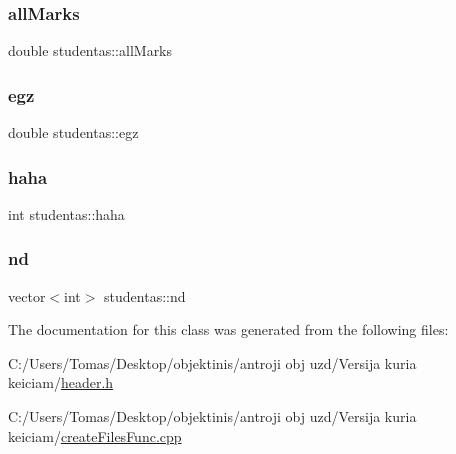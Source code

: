 \subsubsection{\texorpdfstring{allMarks}{allMarks}}
{\footnotesize\ttfamily double studentas\+::all\+Marks\hspace{0.3cm}{\ttfamily [private]}}

\mbox{\label{classstudentas_ae7145730b8737e3ceb2173bcb7460b2d}} 
\subsubsection{\texorpdfstring{egz}{egz}}
{\footnotesize\ttfamily double studentas\+::egz\hspace{0.3cm}{\ttfamily [private]}}

\mbox{\label{classstudentas_af3d5908e76c35d49ffca65ac4d62665c}} 
\subsubsection{\texorpdfstring{haha}{haha}}
{\footnotesize\ttfamily int studentas\+::haha\hspace{0.3cm}{\ttfamily [private]}}

\mbox{\label{classstudentas_a8aef5bd85b89d611446851d143303d35}} 
\subsubsection{\texorpdfstring{nd}{nd}}
{\footnotesize\ttfamily vector$<$int$>$ studentas\+::nd\hspace{0.3cm}{\ttfamily [private]}}



The documentation for this class was generated from the following files\+:\begin{DoxyCompactItemize}
\item 
C\+:/\+Users/\+Tomas/\+Desktop/objektinis/antroji obj uzd/\+Versija kuria keiciam/\mbox{\hyperlink{header_8h}{header.\+h}}\item 
C\+:/\+Users/\+Tomas/\+Desktop/objektinis/antroji obj uzd/\+Versija kuria keiciam/\mbox{\hyperlink{create_files_func_8cpp}{create\+Files\+Func.\+cpp}}\end{DoxyCompactItemize}
